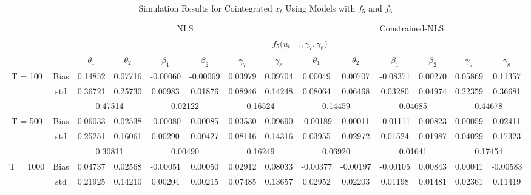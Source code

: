 \documentclass[a4paper,12pt,times,numbered,print,index]{report}
\numberwithin{equation}{section}
\begin{document}
\begin{table}[htbp]
  \centering
  \caption{Simulation Results for Cointegrated $x_t$ Using Models with $f_5$ and $f_6$}
    \begin{adjustbox}{max width=\textwidth}
    \begin{tabular}{cccccccccccccc}
    \toprule
    &       & \multicolumn{6}{c}{NLS}                       & \multicolumn{6}{c}{Constrained-NLS} \\
    &       & \multicolumn{12}{c}{$f_5 (u_{t-1}, \gamma_7, \gamma_8$)}                \\
	&       & $\theta_1$ & $\theta_2$ & $\beta_1$ & $\beta_2$ & $\gamma_7$ & $\gamma_{8}$ & $\theta_1$ & $\theta_2$ & $\beta_1$ & $\beta_2$ & $\gamma_7$ & $\gamma_{8}$ \\
    \midrule
    \multirow{3}[1]{*}{T = 100} & Bias  & 0.14852 & 0.07716 & \textcolor[rgb]{ 0,  .439,  .753}{-0.00060} & -0.00069 & 0.03979 & 0.09704 & 0.00049 & 0.00707 & \textcolor[rgb]{ 0,  .439,  .753}{-0.08371} & 0.00270 & 0.05869 & 0.11357 \\
    & std   & 0.36721 & 0.25730 & 0.00983 & 0.01876 & 0.08946 & 0.14248 & 0.08064 & 0.06468 & 0.03280 & 0.04974 & 0.22359 & 0.36681 \\
    &       & \multicolumn{2}{c}{0.47514} & \multicolumn{2}{c}{0.02122} & \multicolumn{2}{c}{0.16524} & \multicolumn{2}{c}{0.14459} & \multicolumn{2}{c}{0.04685} & \multicolumn{2}{c}{0.44678} \\
    \multirow{3}[0]{*}{T = 500} & Bias  & 0.06033 & 0.02538 & \textcolor[rgb]{ 0,  .439,  .753}{-0.00080} & 0.00085 & 0.03530 & 0.09690 & -0.00189 & 0.00011 & \textcolor[rgb]{ 0,  .439,  .753}{-0.01111} & 0.00823 & 0.00059 & 0.02411 \\
    & std   & 0.25251 & 0.16061 & 0.00290 & 0.00427 & 0.08116 & 0.14316 & 0.03955 & 0.02972 & 0.01524 & 0.01987 & 0.04029 & 0.17323 \\
    &       & \multicolumn{2}{c}{0.30811} & \multicolumn{2}{c}{0.00490} & \multicolumn{2}{c}{0.16249} & \multicolumn{2}{c}{0.06920} & \multicolumn{2}{c}{0.01641} & \multicolumn{2}{c}{0.17454} \\
    \multirow{3}[1]{*}{T = 1000} & Bias  & 0.04737 & 0.02568 & \textcolor[rgb]{ 0,  .439,  .753}{-0.00051} & 0.00050 & 0.02912 & 0.08033 & -0.00377 & -0.00197 & \textcolor[rgb]{ 0,  .439,  .753}{-0.00105} & 0.00843 & 0.00041 & -0.00583 \\
          & std   & 0.21925 & 0.14210 & 0.00204 & 0.00215 & 0.07485 & 0.13657 & 0.02952 & 0.02203 & 0.01198 & 0.01481 & 0.02361 & 0.11419 \\

\end{tabular}
\end{adjustbox}
\end{table}
\end{document}
